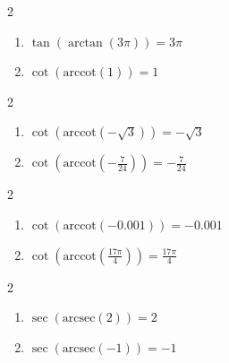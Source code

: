 \documentclass{ximera}
\begin{document}
\begin{multicols}{2}

\begin{enumerate}

\setcounter{enumi}{\value{HW}}

\item $\tan\left(\arctan\left( 3\pi \right)\right) = 3\pi$
\item $\cot\left(\text{arccot}\left(1\right)\right) = 1$

\setcounter{HW}{\value{enumi}}

\end{enumerate}

\end{multicols}

\begin{multicols}{2}

\begin{enumerate}

\setcounter{enumi}{\value{HW}}

\item $\cot\left(\text{arccot}\left(-\sqrt{3}\right)\right) = -\sqrt{3}$ 
\item $\cot\left(\text{arccot}\left(-\frac{7}{24}\right)\right) = -\frac{7}{24}$

\setcounter{HW}{\value{enumi}}

\end{enumerate}

\end{multicols}

\begin{multicols}{2}

\begin{enumerate}

\setcounter{enumi}{\value{HW}}

\item $\cot\left(\text{arccot}\left(-0.001\right)\right) = -0.001$ 
\item $\cot\left(\text{arccot}\left( \frac{17\pi}{4} \right)\right) = \frac{17\pi}{4}$

\setcounter{HW}{\value{enumi}}

\end{enumerate}

\end{multicols}

\begin{multicols}{2}

\begin{enumerate}

\setcounter{enumi}{\value{HW}}

\item $\sec\left(\text{arcsec}\left(2\right)\right) = 2$
\item $\sec\left(\text{arcsec}\left(-1\right)\right) = -1$

\setcounter{HW}{\value{enumi}}

\end{enumerate}

\end{multicols}
\end{document}
